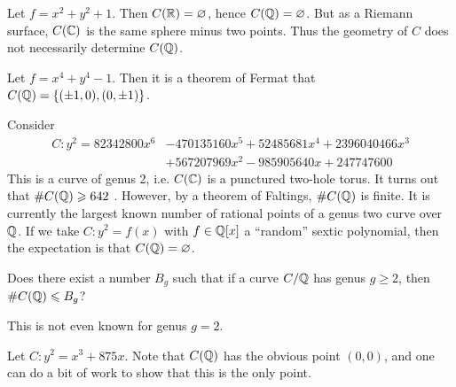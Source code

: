 \documentclass{article}
\begin{document}
\begin{example}
Let $f=x^2+y^2+1$. Then $C(\mathbb{R})=\varnothing$, hence 
$C(\mathbb{Q})=\varnothing$. But as a Riemann surface, $C(\mathbb{C})$ is 
the same sphere minus two points. Thus the geometry of $C$ does not 
necessarily determine $C(\mathbb{Q})$. 
\end{example}

\begin{example}
Let $f=x^4+y^4-1$. Then it is a theorem of Fermat that 
$C(\mathbb{Q})=\{(\pm 1,0),(0,\pm 1)\}$.
\end{example}

\begin{example}[Stoll]
Consider 
\begin{align*}
  C : y^2 = 82342800 x^6 &- 470135160 x^5 + 52485681 x^4 + 2396040466 x^3 \\
    &+ 567207969 x^2 - 985905640 x + 247747600
\end{align*}
This is a curve of genus 2, i.e. $C(\mathbb{C})$ is a punctured two-hole 
torus. It turns out that $\# C(\mathbb{Q})\geqslant 642$ \cite[\S 6]{st09}. 
However, by a theorem of Faltings, $\# C(\mathbb{Q})$ is finite. It is 
currently the largest known number of rational points of a genus two curve 
over $\mathbb{Q}$. If we take $C:y^2=f(x)$ with $f\in\mathbb{Q}[x]$ a 
``random'' sextic polynomial, then the expectation is that 
$C(\mathbb{Q})=\varnothing$. 
\end{example}

\begin{question}
Does there exist a number $B_g$ such that if a curve $C/\mathbb{Q}$ has 
genus $g\geqslant 2$, then $\# C(\mathbb{Q})\leqslant B_g$?
\end{question}

This is not even known for genus $g=2$. 

\begin{example}
Let $C:y^2=x^3+875 x$. Note that $C(\mathbb{Q})$ has the obvious point 
$(0,0)$, and one can do a bit of work to show that this is the only point. 
\end{example}
\end{document}
